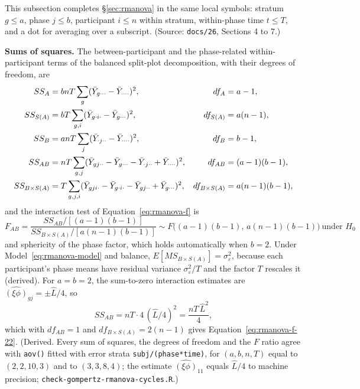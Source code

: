 \documentclass[11pt]{article}
\newcommand{\code}[1]{\texttt{#1}}
\begin{document}
This subsection completes \S\ref{sec:rmanova} in the same local
symbols: stratum $g \le a$, phase $j \le b$, participant $i \le n$
within stratum, within-phase time $t \le T$, and a dot for averaging
over a subscript. (Source: \code{docs/26}, Sections 4 to 7.)

\textbf{Sums of squares.} The between-participant and the
phase-related within-participant terms of the balanced split-plot
decomposition, with their degrees of freedom, are
\begin{align}
SS_A &= bnT \sum_{g} (\bar Y_{g\cdot\cdot\cdot} -
  \bar Y_{\cdot\cdot\cdot\cdot})^2,
  & df_A &= a - 1, \notag \\
SS_{S(A)} &= bT \sum_{g,i} (\bar Y_{g\cdot i\cdot} -
  \bar Y_{g\cdot\cdot\cdot})^2,
  & df_{S(A)} &= a(n - 1), \notag \\
SS_B &= anT \sum_{j} (\bar Y_{\cdot j\cdot\cdot} -
  \bar Y_{\cdot\cdot\cdot\cdot})^2,
  & df_B &= b - 1, \notag \\
SS_{AB} &= nT \sum_{g,j} (\bar Y_{gj\cdot\cdot} -
  \bar Y_{g\cdot\cdot\cdot} - \bar Y_{\cdot j\cdot\cdot} +
  \bar Y_{\cdot\cdot\cdot\cdot})^2,
  & df_{AB} &= (a-1)(b-1), \notag \\
SS_{B\times S(A)} &= T \sum_{g,j,i} (\bar Y_{gji\cdot} -
  \bar Y_{g\cdot i\cdot} - \bar Y_{gj\cdot\cdot} +
  \bar Y_{g\cdot\cdot\cdot})^2,
  & df_{B\times S(A)} &= a(n-1)(b-1),
\label{eq:invb-ss}
\end{align}
and the interaction test of Equation~\eqref{eq:rmanova-f} is
\begin{equation}
F_{AB} = \frac{SS_{AB}/[(a-1)(b-1)]}{SS_{B\times S(A)}/[a(n-1)(b-1)]}
  \sim F\big((a-1)(b-1),\, a(n-1)(b-1)\big) \ \text{under } H_0
\label{eq:invb-fab-general}
\end{equation}
and sphericity of the phase factor, which holds automatically when
$b = 2$. Under Model~\eqref{eq:rmanova-model} and balance,
$E[MS_{B\times S(A)}] = \sigma_\varepsilon^2$, because each
participant's phase means have residual variance
$\sigma_\varepsilon^2/T$ and the factor $T$ rescales it (derived). For
$a = b = 2$, the sum-to-zero interaction estimates are
$\widehat{(\xi\phi)}_{gj} = \pm\hat L/4$, so
\begin{equation}
SS_{AB} = nT \cdot 4\,(\hat L/4)^2 = \frac{nT\,\hat L^2}{4},
\label{eq:invb-ssab-22}
\end{equation}
which with $df_{AB} = 1$ and $df_{B\times S(A)} = 2(n-1)$ gives
Equation~\eqref{eq:rmanova-f-22}. (Derived. Every sum of squares, the
degrees of freedom and the $F$ ratio agree with \code{aov()} fitted
with error strata \code{subj/\allowbreak(phase*time)}, for
$(a, b, n, T)$ equal to $(2, 2, 10, 3)$ and to $(3, 3, 8, 4)$; the
estimate $\widehat{(\xi\phi)}_{11}$ equals $\hat L/4$ to machine
precision; \code{check-gompertz-rmanova-cycles.R}.)
\end{document}
